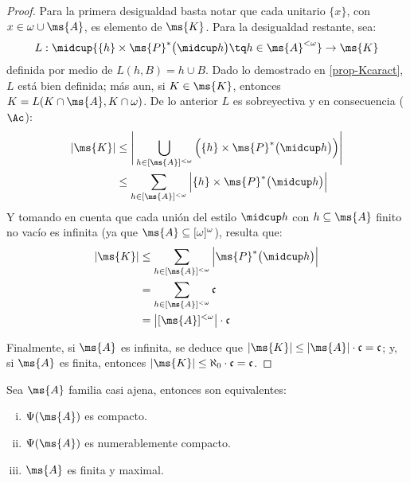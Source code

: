 	\begin{proof} 
		Para la primera desigualdad basta notar que cada unitario $\{x\}$, con $x \in \omega \cup \ms{A}$, es elemento de $\ms{K}$. Para la desigualdad restante, sea:
		$$ L: \midcup \{ \{h\} \times \ms{P}^*\big( \midcup h \big) \tq h \in \ms{A}^{<\omega} \} \to \ms{K} $$
		definida por medio de $L(h,B)=h \cup B$. Dado lo demostrado en \ref{prop-Kcaract}, $L$ está bien definida; más aun, si $K \in \ms{K}$, entonces $K=L(K \cap \ms{A}, K \cap \omega)$. De lo anterior $L$ es sobreyectiva y en consecuencia ($\Ac$):
		\begin{align*}
			|\ms{K}| & \leq \Bigg| \bigcup_{h \in [\ms{A}]^{<\omega}} \Big( \{h\} \times \ms{P}^*\big( \midcup h \big) \Big) \Bigg| \\
			& \leq \sum_{h \in [\ms{A}]^{<\omega}} \Big| \{h\} \times \ms{P}^*\big( \midcup h \big) \Big| 
		\end{align*}
		Y tomando en cuenta que cada unión del estilo $\midcup h$ con $h \subseteq \ms{A}$ finito no vacío es infinita	 (ya que $\ms{A} \subseteq [\omega]^\omega$), resulta que:
		\begin{align*}
			|\ms{K}| & \leq \sum_{h \in [\ms{A}]^{<\omega}} \Big| \ms{P}^*\big( \midcup h \big) \Big| \\
			& = \sum_{h \in [\ms{A}]^{<\omega}} \mathfrak{c} \\
			& = \left| [\ms{A}]^{<\omega} \right| \cdot \mathfrak{c}
		\end{align*}
		
		Finalmente, si $\ms{A}$ es infinita, se deduce que $|\ms{K}|\leq|\ms{A}| \cdot \mathfrak{c} = \mathfrak{c}$; y, si $\ms{A}$ es finita, entonces $|\ms{K}|\leq \aleph_0 \cdot \mathfrak{c} = \mathfrak{c}$.
	\end{proof} 
	
	\begin{proposicion}\label{prop-tra-compacidad}
		Sea $\ms{A}$ familia casi ajena, entonces son equivalentes:
		\begin{enumerate}[i)]
			\item $\Psi(\ms{A})$ es compacto.
			\item $\Psi(\ms{A})$ es numerablemente compacto.
			\item $\ms{A}$ es finita y maximal.
		\end{enumerate}
	\end{proposicion}
	
